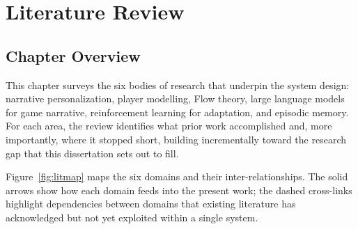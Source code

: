 \chapter{Literature Review}

\section{Chapter Overview}

This chapter surveys the six bodies of research that underpin the system design: narrative personalization, player modelling, Flow theory, large language models for game narrative, reinforcement learning for adaptation, and episodic memory. For each area, the review identifies what prior work accomplished and, more importantly, where it stopped short, building incrementally toward the research gap that this dissertation sets out to fill.

Figure~\ref{fig:litmap} maps the six domains and their inter-relationships. The solid arrows show how each domain feeds into the present work; the dashed cross-links highlight dependencies between domains that existing literature has acknowledged but not yet exploited within a single system.

